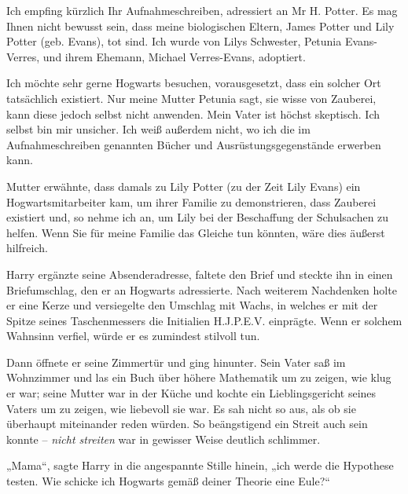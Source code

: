 \begin{writtenNote}


Ich empfing kürzlich Ihr Aufnahmeschreiben, adressiert an Mr H. Potter. Es mag Ihnen nicht bewusst sein, dass meine biologischen Eltern, James Potter und Lily Potter (geb. Evans), tot sind. Ich wurde von Lilys Schwester, Petunia Evans-Verres, und ihrem Ehemann, Michael Verres-Evans, adoptiert.

Ich möchte sehr gerne Hogwarts besuchen, vorausgesetzt, dass ein solcher Ort tatsächlich existiert. Nur meine Mutter Petunia sagt, sie wisse von Zauberei, kann diese jedoch selbst nicht anwenden. Mein Vater ist höchst skeptisch. Ich selbst bin mir unsicher. Ich weiß außerdem nicht, wo ich die im Aufnahmeschreiben genannten Bücher und Ausrüstungsgegenstände erwerben kann.

Mutter erwähnte, dass damals zu Lily Potter (zu der Zeit Lily Evans) ein Hogwartsmitarbeiter kam, um ihrer Familie zu demonstrieren, dass Zauberei existiert und, so nehme ich an, um Lily bei der Beschaffung der Schulsachen zu helfen. Wenn Sie für meine Familie das Gleiche tun könnten, wäre dies äußerst hilfreich.

\end{writtenNote}

Harry ergänzte seine Absenderadresse, faltete den Brief und steckte ihn in einen Briefumschlag, den er an Hogwarts adressierte. Nach weiterem Nachdenken holte er eine Kerze und versiegelte den Umschlag mit Wachs, in welches er mit der Spitze seines Taschenmessers die Initialien H.J.P.E.V. einprägte. Wenn er solchem Wahnsinn verfiel, würde er es zumindest stilvoll tun.

Dann öffnete er seine Zimmertür und ging hinunter. Sein Vater saß im Wohnzimmer und las ein Buch über höhere Mathematik um zu zeigen, wie klug er war; seine Mutter war in der Küche und kochte ein Lieblingsgericht seines Vaters um zu zeigen, wie liebevoll sie war. Es sah nicht so aus, als ob sie überhaupt miteinander reden würden. So beängstigend ein Streit auch sein konnte – \emph{nicht streiten} war in gewisser Weise deutlich schlimmer.

„Mama“, sagte Harry in die angespannte Stille hinein, „ich werde die Hypothese testen. Wie schicke ich Hogwarts gemäß deiner Theorie eine Eule?“


